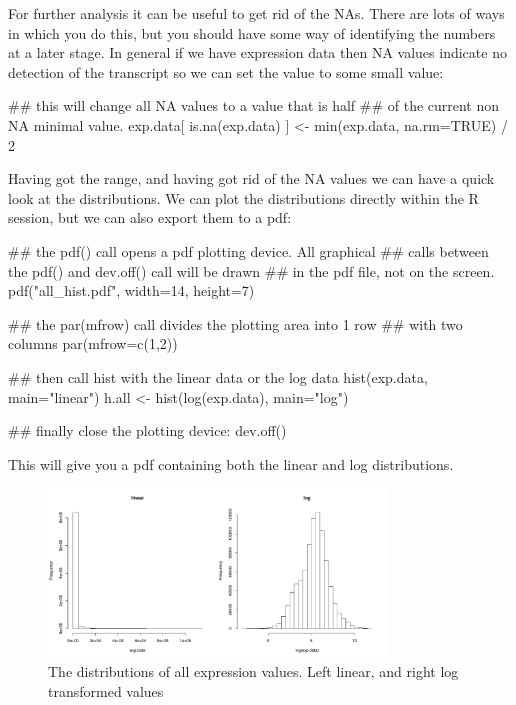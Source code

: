 \documentclass[11pt]{article}
\begin{document}
For further analysis it can be useful to get rid of the NAs. There
are lots of ways in which you do this, but you should have some
way of identifying the numbers at a later stage. In general if
we have expression data then NA values indicate no detection of the
transcript so we can set the value to some small value:

\begin{rcode}
  ## this will change all NA values to a value that is half
  ## of the current non NA minimal value.
  exp.data[ is.na(exp.data) ] <- min(exp.data, na.rm=TRUE) / 2
\end{rcode}

Having got the range, and having got rid of the NA values we can have
a quick look at the distributions. We can plot the distributions directly
within the R session, but we can also export them to a pdf:

\begin{rcode}
  ## the pdf() call opens a pdf plotting device. All graphical
  ## calls between the pdf() and dev.off() call will be drawn
  ## in the pdf file, not on the screen.
  pdf("all_hist.pdf", width=14, height=7)

  ## the par(mfrow) call divides the plotting area into 1 row
  ## with two columns
  par(mfrow=c(1,2))
  
  ## then call hist with the linear data or the log data
  hist(exp.data, main="linear")
  h.all <- hist(log(exp.data), main="log")

  ## finally close the plotting device:
  dev.off()
\end{rcode}

This will give you a pdf containing both the linear and log distributions.

\begin{figure}[ht]
  \includegraphics[width=0.8\textwidth]{images/all_hist.pdf}
  \caption{The distributions of all expression values. Left linear, and
    right log transformed values}
  \label{allhist}
\end{figure}
\end{document}
